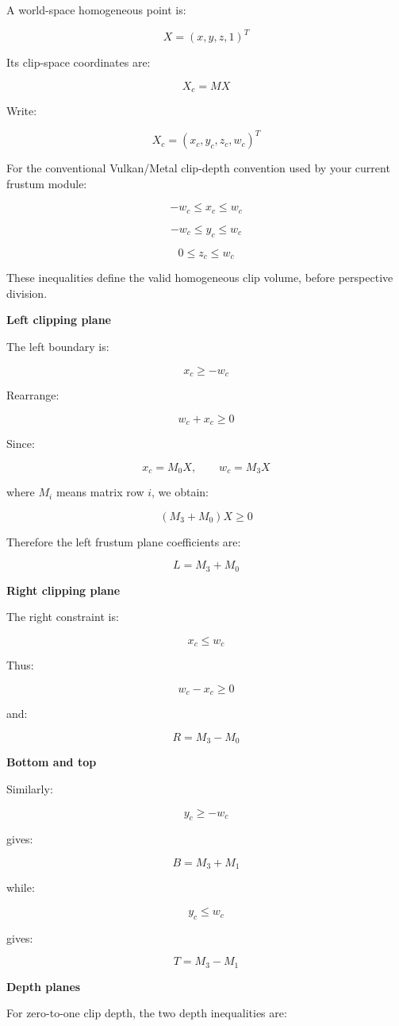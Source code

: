 A world-space homogeneous point is:

\[
X=(x,y,z,1)^T
\]

Its clip-space coordinates are:

\[
X_c=MX
\]

Write:

\[
X_c=(x_c,y_c,z_c,w_c)^T
\]

For the conventional Vulkan/Metal clip-depth convention used by your current frustum module:

\[
-w_c\le x_c\le w_c
\]

\[
-w_c\le y_c\le w_c
\]

\[
0\le z_c\le w_c
\]

These inequalities define the valid homogeneous clip volume, before perspective division.

\textbf{Left clipping plane}

The left boundary is:

\[
x_c\ge-w_c
\]

Rearrange:

\[
w_c+x_c\ge0
\]

Since:

\[
x_c=M_0X,\qquad w_c=M_3X
\]

where \(M_i\) means matrix row \(i\), we obtain:

\[
\boxed{ (M_3+M_0)X\ge0 }
\]

Therefore the left frustum plane coefficients are:

\[
\boxed{L=M_3+M_0}
\]

\textbf{Right clipping plane}

The right constraint is:

\[
x_c\le w_c
\]

Thus:

\[
w_c-x_c\ge0
\]

and:

\[
\boxed{R=M_3-M_0}
\]

\textbf{Bottom and top}

Similarly:

\[
y_c\ge-w_c
\]

gives:

\[
\boxed{B=M_3+M_1}
\]

while:

\[
y_c\le w_c
\]

gives:

\[
\boxed{T=M_3-M_1}
\]

\textbf{Depth planes}

For zero-to-one clip depth, the two depth inequalities are:

